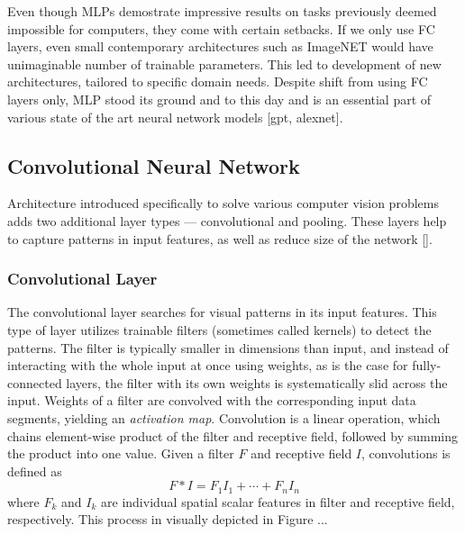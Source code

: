 Even though MLPs demostrate impressive results on tasks previously deemed impossible for computers, they come with certain setbacks.
If we only use FC layers, even small contemporary architectures such as ImageNET would have unimaginable number of trainable parameters.
This led to development of new architectures, tailored to specific domain needs.
Despite shift from using FC layers only, MLP stood its ground and to this day and is an essential part of various state of the art neural network models [gpt, alexnet].

\subsection*{Convolutional Neural Network}
Architecture introduced specifically to solve various computer vision problems adds two additional layer types --- convolutional and pooling.
These layers help to capture patterns in input features, as well as reduce size of the network []. 


\subsubsection{Convolutional Layer}

The convolutional layer searches for visual patterns in its input features.
This type of layer utilizes trainable filters (sometimes called kernels) to detect the patterns.
The filter is typically smaller in dimensions than input, and instead of interacting with the whole input at once using weights, as is the case for fully-connected layers, the filter with its own weights is systematically slid across the input.
Weights of a filter are convolved with the corresponding input data segments, yielding an \emph{activation map}.
Convolution is a linear operation, which chains element-wise product of the filter and receptive field, followed by summing the product into one value. Given a filter $F$ and receptive field $I$, convolutions is defined as
\begin{equation}
    F * I = F_1 I_1 + \cdots + F_n I_n
\end{equation}
where $F_k$ and $I_k$ are individual spatial scalar features in filter and receptive field, respectively. This process in visually depicted in Figure ...


